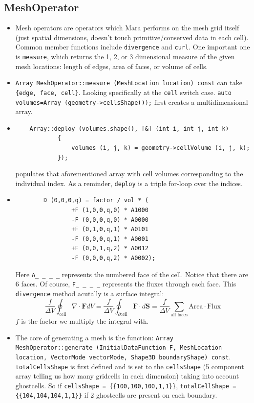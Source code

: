 \documentclass{article}
\begin{document}
\subsection{MeshOperator}
\begin{itemize}
	\item Mesh operators are operators which Mara performs on the mesh grid itself (just spatial dimensions, doesn't touch primitive/conserved data in each cell). Common member functions include \texttt{divergence} and \texttt{curl}. One important one is \texttt{measure}, which returns the 1, 2, or 3 dimensional measure of the given mesh locations: length of edges, area of faces, or volume of cells.
	
	\item \texttt{Array MeshOperator::measure (MeshLocation location) const} can take \texttt{\{edge, face, cell\}}. Looking specifically at the \texttt{cell} switch case. \texttt{auto volumes=Array (geometry->cellsShape());} first creates a multidimensional array. 
	
	\item \begin{verbatim}
	Array::deploy (volumes.shape(), [&] (int i, int j, int k)
            {
                volumes (i, j, k) = geometry->cellVolume (i, j, k);
            });
	\end{verbatim} 
populates that aforementioned array with cell volumes corresponding to the individual index. As a reminder, \texttt{deploy} is a triple for-loop over the indices.
	
	\item \begin{verbatim}
		D (0,0,0,q) = factor / vol * (
                +F (1,0,0,q,0) * A1000
                -F (0,0,0,q,0) * A0000
                +F (0,1,0,q,1) * A0101
                -F (0,0,0,q,1) * A0001
                +F (0,0,1,q,2) * A0012
                -F (0,0,0,q,2) * A0002);
	\end{verbatim}
Here \texttt{A\_ \_ \_ \_} represents the numbered face of the cell. Notice that there are 6 faces. Of course, \texttt{F\_ \_ \_ \_} represents the fluxes through each face. This \texttt{divergence} method acutally is a surface integral:
	$$\frac{f}{\Delta V}\oint_{\text{cell}} \nabla \cdot \mathbf{F} dV = \frac{f}{\Delta V}\oint_{\partial \text{cell}} \mathbf{F} \cdot d\mathbf{S} = \frac{f}{\Delta V}\sum_{\text{all faces}}\text{Area} \cdot \text{Flux}$$
$f$ is the factor we multiply the integral with. 
		
	\item The core of generating a mesh is the function:
	\texttt{Array MeshOperator::generate (InitialDataFunction F, MeshLocation location, VectorMode vectorMode, Shape3D boundaryShape) const}. \texttt{totalCellsShape} is first defined and is set to the \texttt{cellsShape} (5 component array telling us how many gridcells in each dimension) taking into account ghostcells. So if \texttt{cellsShape = \{\{100,100,100,1,1\}\}}, \texttt{totalCellShape = \{\{104,104,104,1,1\}\}} if 2 ghostcells are present on each boundary.
	

\end{itemize}
\end{document}
